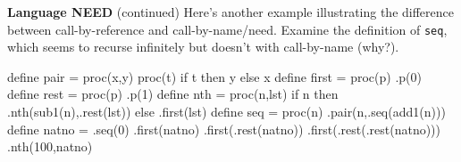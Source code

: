 \begin{minipage}[t]{\sw}
\slidenumber
\LARGE
{\bf Language NEED} (continued)\exx
Here's another example illustrating the difference
between call-by-reference and call-by-name/need.
Examine the definition of \verb.seq., which seems
to recurse infinitely but doesn't with call-by-name (why?).
\begin{qv}
define pair = proc(x,y)
  proc(t) if t then y else x
define first = proc(p) .p(0)
define rest = proc(p) .p(1)
define nth = proc(n,lst)    %
  if n then .nth(sub1(n),.rest(lst)) else .first(lst)
define seq = proc(n) .pair(n,.seq(add1(n)))
define natno = .seq(0)      %
.first(natno)               %
.first(.rest(natno))        %
.first(.rest(.rest(natno))) %
.nth(100,natno)             %
\end{qv}
\end{minipage}
\clearpage
